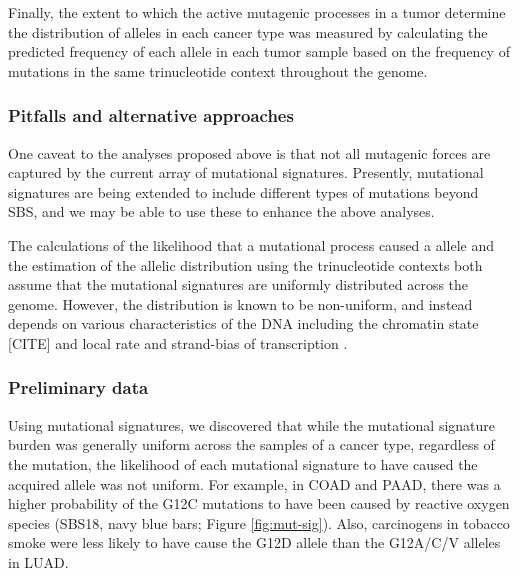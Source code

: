 Finally, the extent to which the active mutagenic processes in a tumor determine the distribution of \KRAS{} alleles in each cancer type was measured by calculating the predicted frequency of each allele in each tumor sample based on the frequency of mutations in the same trinucleotide context throughout the genome.


\subsubsection*{Pitfalls and alternative approaches}

One caveat to the analyses proposed above is that not all mutagenic forces are captured by the current array of mutational signatures.
Presently, mutational signatures are being extended to include different types of mutations beyond SBS, and we may be able to use these to enhance the above analyses.

The calculations of the likelihood that a mutational process caused a \KRAS{} allele and the estimation of the allelic distribution using the trinucleotide contexts both assume that the mutational signatures are uniformly distributed across the genome.
However, the distribution is known to be non-uniform, and instead depends on various characteristics of the DNA including the chromatin state [CITE] and local rate and strand-bias of transcription \cite{Tomkova2018MutationalAsymmetry}.


\subsubsection*{Preliminary data}

Using mutational signatures, we discovered that while the mutational signature burden was generally uniform across the samples of a cancer type, regardless of the \KRAS{} mutation, the likelihood of each mutational signature to have caused the acquired allele was not uniform.
For example, in COAD and PAAD, there was a higher probability of the \KRAS{} G12C mutations to have been caused by reactive oxygen species (SBS18, navy blue bars; Figure \ref{fig:mut-sig}).
Also, carcinogens in tobacco smoke were less likely to have cause the G12D allele than the G12A/C/V alleles in LUAD.

